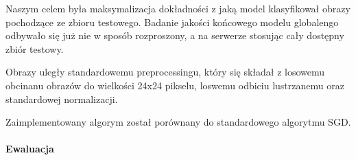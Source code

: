   Naszym celem była maksymalizacja dokładności z jaką model klasyfikował obrazy pochodzące ze
  zbioru testowego. Badanie jakości końcowego modelu globalengo odbywało się już nie w sposób
  rozproszony, a na serwerze stosując cały dostępny zbiór testowy.

  Obrazy uległy standardowemu preprocessingu, który się składał z losowemu obcinanu obrazów do wielkości 24x24 pikselu, loswemu odbiciu lustrzanemu oraz standardowej normalizacji.

  Zaimplementowany algorym został porównany do standardowego algorytmu SGD.



  \paragraph{Ewaluacja}
